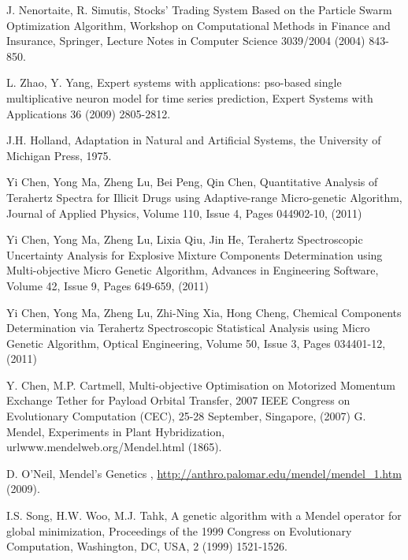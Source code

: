 \begin{thebibliography}{00}
 J. Nenortaite, R. Simutis,
Stocks' Trading System Based on the Particle Swarm Optimization
Algorithm, Workshop on Computational Methods in Finance and
Insurance, Springer, Lecture Notes in Computer Science 3039/2004 (2004) 843-850.

L. Zhao, Y. Yang, Expert systems with applications: pso-based
single multiplicative neuron model for time series prediction,
Expert Systems with Applications 36 (2009) 2805-2812.

 J.H. Holland,
         Adaptation in Natural and Artificial Systems,
              the University of Michigan Press, 1975.

 Yi Chen, Yong Ma, Zheng Lu, Bei Peng, Qin Chen,
         Quantitative Analysis of Terahertz Spectra for Illicit Drugs using Adaptive-range Micro-genetic Algorithm,
         Journal of Applied Physics, 
         Volume 110, Issue 4, Pages 044902-10, (2011)
              
Yi Chen, Yong Ma, Zheng Lu, Lixia Qiu, Jin He, Terahertz Spectroscopic Uncertainty Analysis for Explosive Mixture Components Determination using Multi-objective Micro Genetic Algorithm, Advances in Engineering Software, Volume 42, Issue 9, Pages 649-659, (2011)

Yi Chen, Yong Ma, Zheng Lu, Zhi-Ning Xia, Hong Cheng, Chemical Components Determination via Terahertz Spectroscopic Statistical Analysis using Micro Genetic Algorithm, Optical Engineering, Volume 50, Issue 3, Pages 034401-12, (2011)

Y. Chen, M.P. Cartmell, Multi-objective Optimisation on Motorized Momentum Exchange Tether for Payload Orbital Transfer, 2007 IEEE Congress on Evolutionary Computation (CEC), 25-28 September, Singapore, (2007) 
 G. Mendel,
            Experiments in Plant Hybridization,
            url{www.mendelweb.org/Mendel.html} (1865).

 D. O'Neil,
         Mendel's Genetics ,
         \url{http://anthro.palomar.edu/mendel/mendel_1.htm} (2009).

 I.S. Song, H.W. Woo, M.J. Tahk,
            A genetic algorithm with a Mendel operator for global minimization,
             Proceedings of the 1999 Congress on Evolutionary Computation,
             Washington, DC, USA,
             2 (1999) 1521-1526. 


\end{thebibliography}
